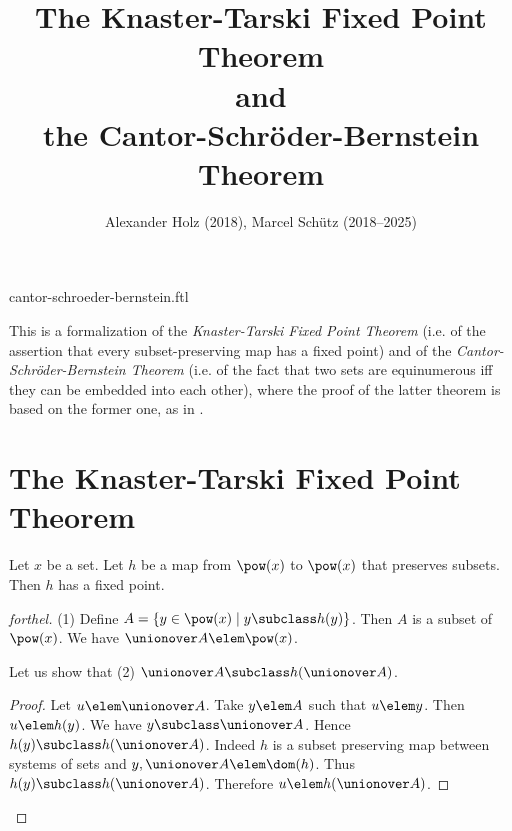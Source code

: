 \documentclass{article}
\title{The Knaster-Tarski Fixed Point Theorem\\and\\the Cantor-Schröder-Bernstein Theorem}
\author{Alexander Holz (2018), Marcel Schütz (2018--2025)}
\date{}
\begin{document}
\begin{smodule}{cantor-schroeder-bernstein.ftl}
\maketitle


\noindent This is a formalization of the \textit{Knaster-Tarski Fixed Point
Theorem} (i.e. of the assertion that every subset-preserving map has a fixed
point) and of the \textit{Cantor-Schröder-Bernstein Theorem} (i.e. of the
fact that two sets are equinumerous iff they can be embedded into each other),
where the proof of the latter theorem is based on the former one, as in
\cite{Schroeder2012}.

\section*{The Knaster-Tarski Fixed Point Theorem}

\begin{theorem}[forthel,title=Knaster-Tarski,id=knaster_tarski]
  Let $x$ be a set.
  Let $h$ be a map from $\pow(x)$ to $\pow(x)$ that preserves subsets.
  Then $h$ has a fixed point.
\end{theorem}
\begin{proof}[forthel]
  (1) Define $A = \{y \in \pow(x) \mid y \subclass h(y)\}$.
  Then $A$ is a subset of $\pow(x)$.
  We have $\unionover A \elem \pow(x)$.

  Let us show that (2) $\unionover A \subclass h(\unionover A)$.
  \begin{proof}
    Let $u \elem \unionover A$.
    Take $y \elem A$ such that $u \elem y$.
    Then $u \elem h(y)$.
    We have $y \subclass \unionover A$.
    Hence $h(y) \subclass h(\unionover A)$.
    Indeed $h$ is a subset preserving map between systems of sets and $y, \unionover A \elem \dom(h)$.
    Thus $h(y) \subclass h(\unionover A)$.
    Therefore $u \elem h(\unionover A)$.
  \end{proof}


\end{proof}
\end{smodule}
\end{document}

